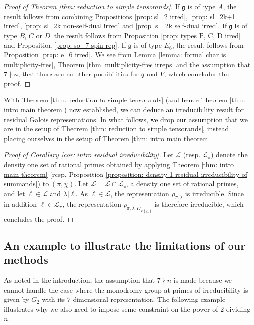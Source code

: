 \documentclass{amsart}
\theoremstyle{definition}
\numberwithin{equation}{section} %
\newcommand{\mc}[1]{\mathcal{#1}}
\newcommand{\mf}[1]{\mathfrak{#1}}
\newcommand{\ol}[1]{\overline{#1}}
\begin{document}
\begin{proof}[Proof of Theorem \ref{thm: reduction to simple tensorands}]
If $\mf{g}$ is of type $A$, the result follows from combining Propositions \ref{prop: sl_2 irred}, \ref{prop: sl_2k+1 irred}, \ref{prop: sl_2k non-self-dual irred} and \ref{prop: sl_2k self-dual irred}.
If $\mf{g}$ is of type $B$, $C$ or $D$, the result follows from Proposition \ref{prop: types B, C, D irred} and Proposition \ref{prop: so_7 spin rep}.
If $\mf{g}$ is of type $E_6$, the result follows from Proposition \ref{prop: e_6 irred}.
We see from Lemma \ref{lemma: formal char is multiplicity-free}, Theorem \ref{thm: multiplicity-free irreps} and the assumption that $7 \nmid n$, that there are no other possibilities for $\mf{g}$ and $V$, which concludes the proof.
\end{proof}

With Theorem \ref{thm: reduction to simple tensorands} (and hence Theorem \ref{thm: intro main theorem}) now established, we can deduce an irreducibility result for residual Galois representations.
In what follows, we drop our assumption that we are in the setup of Theorem \ref{thm: reduction to simple tensorands}, instead placing ourselves in the setup of Theorem \ref{thm: intro main theorem}.

\begin{proof}[Proof of Corollary \ref{cor: intro residual irreducibility}]
Let $\mc{L}$ (resp. $\mc{L}_\pi$) denote the density one set of rational primes obtained by applying Theorem \ref{thm: intro main theorem} (resp. Proposition \ref{proposition: density 1 residual irreducibility of summands}) to $(\pi,\chi)$.
Let $\ol{\mc{L}} = \mc{L} \cap \mc{L}_\pi$, a density one set of rational primes, and let $\ell \in \ol{\mc{L}}$ and $\lambda|\ell$.
As $\ell \in \mc{L}$, the representation $\rho_{\pi,\lambda}$ is irreducible.
Since in addition $\ell \in \mc{L}_\pi$, the representation $\ol{\rho_{\pi,\lambda}}|_{G_{F(\zeta_\ell)}}$ is therefore irreducible, which concludes the proof.
\end{proof}

\subsection{An example to illustrate the limitations of our methods}

As noted in the introduction, the assumption that $7 \nmid n$ is made because we cannot handle the case where the monodromy group at primes of irreducibility is given by $G_2$ with its $7$-dimensional representation.
The following example illustrates why we also need to impose some constraint on the power of $2$ dividing $n$.
\end{document}
